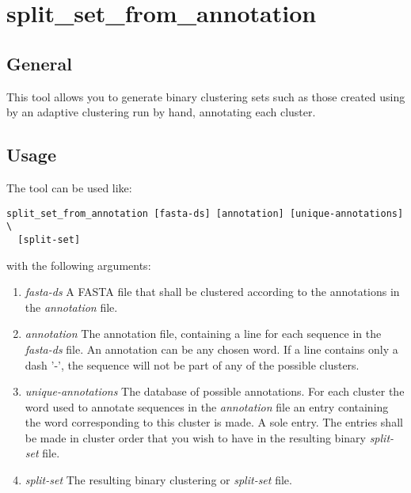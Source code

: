 \section{split\_set\_from\_annotation} \label{sec-ssannotation}

\subsection{General}

This tool allows you to generate binary clustering sets such as those created
using by an adaptive clustering run by hand, annotating each cluster.

\subsection{Usage}
The tool can be used like:
\begin{lstlisting}
split_set_from_annotation [fasta-ds] [annotation] [unique-annotations] \
  [split-set]
\end{lstlisting}
with the following arguments:
\begin{enumerate}
\item \emph{fasta-ds} A FASTA file that shall be clustered according to the
  annotations in the \emph{annotation} file.
\item \emph{annotation} The annotation file, containing a line for each
  sequence in the \emph{fasta-ds} file. An annotation can be any chosen word.
  If a line contains only a dash '-', the sequence will not be part of any of
  the possible clusters.
\item \emph{unique-annotations} The database of possible annotations.
  For each cluster the word used to annotate sequences in the \emph{annotation}
  file an entry containing the word corresponding to this cluster is made.
  A sole entry. The entries shall be made in cluster order that you wish
  to have in the resulting binary \emph{split-set} file.
\item \emph{split-set} The resulting binary clustering or \emph{split-set}
  file.
\end{enumerate}
